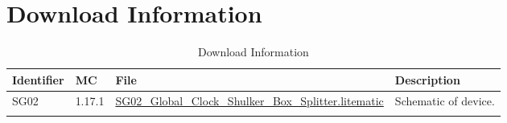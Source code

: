 \documentclass[10pt]{datasheet}
\begin{document}
\section{Download Information}
\begin{table}[H]
    \caption{Download Information}
    \begin{tabularx}{\textwidth}{l | l | l | X}
        \thickhline
        \textbf{Identifier} & \textbf{MC} & \textbf{File} & \textbf{Description} \\
        \hline
        SG02 & 1.17.1 & \href{https://github.com/Soontech-Annals/Archive/blob/8413f90a054b6c415703bae02badeba7541344f6/Archive/splitting/SG02\%20Global\%20Clock\%20Shulker\%20Box\%20Splitter/SG02\_Global\_Clock\_Shulker\_Box\_Splitter.litematic?raw=1}{SG02\_Global\_Clock\_Shulker\_Box\_Splitter.litematic} & Schematic of device. \\
        \hline
        \thickhline
    \end{tabularx}
\end{table}
\end{document}

